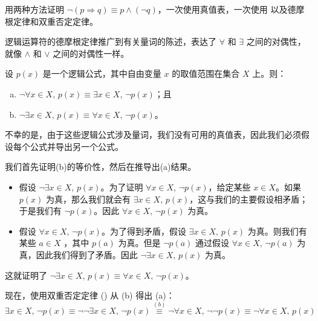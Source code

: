 \begin{exercise}
\label{exNegationOfImplication}
用两种方法证明 $\neg (p \Rightarrow q) \equiv p \wedge (\neg q)$，一次使用真值表，一次使用  以及德摩根定律和双重否定定律。
\end{exercise}

逻辑运算符的德摩根定律推广到有关量词的陈述，表达了 $\forall$ 和 $\exists$ 之间的对偶性，就像 $\wedge$ 和 $\vee$ 之间的对偶性一样。

\begin{theorem}[量词德摩根定律]
\label{thmDeMorganQuantifiers}
设 $p(x)$ 是一个逻辑公式，其中自由变量 $x$ 的取值范围在集合 $X$ 上。则：
\begin{enumerate}[(a)]
\item $\neg \forall x \in X,\, p(x) \equiv \exists x \in X,\, \neg p(x)$；且
\item $\neg \exists x \in X,\, p(x) \equiv \forall x \in X,\, \neg p(x)$。
\end{enumerate}
\end{theorem}

\begin{cproof}
不幸的是，由于这些逻辑公式涉及量词，我们没有可用的真值表，因此我们必须假设每个公式并导出另一个公式。

我们首先证明(b)的等价性，然后在推导出(a)结果。

\begin{itemize}
\item 假设 $\neg \exists x \in X,\, p(x)$。为了证明 $\forall x \in X,\, \neg p(x)$，给定某些 $x \in X$。如果 $p(x)$ 为真，那么我们就会有 $\exists x \in X,\, p(x)$，这与我们的主要假设相矛盾；于是我们有 $\neg p(x)$。因此 $\forall x \in X,\, \neg p(x)$ 为真。

\item 假设 $\forall x \in X,\, \neg p(x)$。为了得到矛盾，假设 $\exists x \in X,\, p(x)$ 为真。则我们有某些 $a \in X$ ，其中 $p(a)$ 为真。但是 $\neg p(a)$ 通过假设 $\forall x \in X,\, \neg p(a)$ 为真，因此我们得到了矛盾。因此 $\neg \exists x \in X,\, p(x)$ 为真。
\end{itemize}

这就证明了 $\neg \exists x \in X,\, p(x) \equiv \forall x \in X,\, \neg p(x)$。

现在，使用双重否定定律 () 从 (b) 得出 (a)：
\[ \exists x \in X,\, \neg p(x) \equiv \neg\neg \exists x \in X,\, \neg p(x) \overset{(b)}{\equiv} \neg \forall x \in X,\, \neg \neg p(x) \equiv \neg \forall x \in X,\, p(x)\]
\end{cproof}

